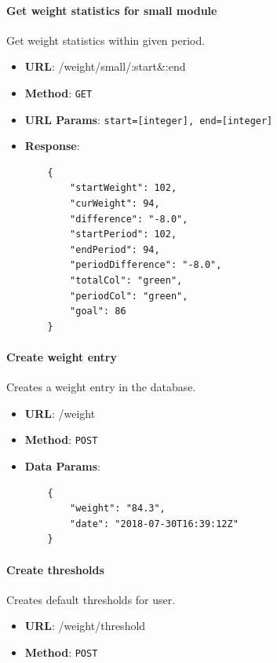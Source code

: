         \paragraph{Get weight statistics for small module} Get weight statistics within given period.
        \begin{itemize}
            \item \textbf{URL}: /weight/small/:start\&:end
            \item \textbf{Method}: \texttt{GET}
            \item \textbf{URL Params}: \texttt{start=[integer], end=[integer]}
            \item \textbf{Response}: \begin{verbatim}
    {
        "startWeight": 102,
        "curWeight": 94,
        "difference": "-8.0",
        "startPeriod": 102,
        "endPeriod": 94,
        "periodDifference": "-8.0",
        "totalCol": "green",
        "periodCol": "green",
        "goal": 86
    }
            \end{verbatim}
        \end{itemize}

        \paragraph{Create weight entry} Creates a weight entry in the database.
        \begin{itemize}
            \item \textbf{URL}: /weight
            \item \textbf{Method}: \texttt{POST}
            \item \textbf{Data Params}: \begin{verbatim}
    {
        "weight": "84.3",
        "date": "2018-07-30T16:39:12Z"
    }   
            \end{verbatim}
        \end{itemize}

        \paragraph{Create thresholds} Creates default thresholds for user.
        \begin{itemize}
            \item \textbf{URL}: /weight/threshold
            \item \textbf{Method}: \texttt{POST}
        \end{itemize}

